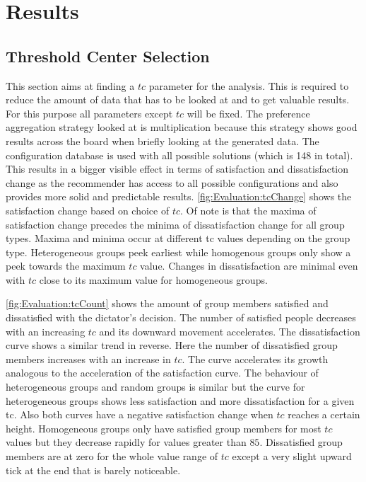 \section{Results}
\label{sec:Evaluation:Findings}

\subsection{Threshold Center Selection}
This section aims at finding a $tc$ parameter for the analysis. This is required to reduce the amount of data that has to be looked at and to get valuable results. For this purpose all parameters except $tc$ will be fixed. The preference aggregation strategy looked at is multiplication because this strategy shows good results across the board when briefly looking at the generated data. The configuration database is used with all possible solutions (which is 148 in total). This results in a bigger visible effect in terms of satisfaction and dissatisfaction change as the recommender has access to all possible configurations and also provides more solid and predictable results. \autoref{fig:Evaluation:tcChange} shows the satisfaction change based on choice of $tc$. Of note is that the maxima of satisfaction change precedes the minima of dissatisfaction change for all group types. Maxima and minima occur at different tc values depending on the group type. Heterogeneous groups peek earliest while homogenous groups only show a peek towards the maximum $tc$ value. Changes in dissatisfaction are minimal even with $tc$ close to its maximum value for homogeneous groups. 

\autoref{fig:Evaluation:tcCount} shows the amount of group members satisfied and dissatisfied with the dictator's decision. The number of satisfied people decreases with an increasing $tc$ and its downward movement accelerates. The dissatisfaction curve shows a similar trend in reverse. Here the number of dissatisfied group members increases with an increase in $tc$. The curve accelerates its growth analogous to the acceleration of the satisfaction curve. The behaviour of heterogeneous groups and random groups is similar but the curve for heterogeneous groups shows less satisfaction and more dissatisfaction for a given tc. Also both curves have a negative satisfaction change when $tc$ reaches a certain height. Homogeneous groups only have satisfied group members for most $tc$ values but they decrease rapidly for values greater than $85$. Dissatisfied group members are at zero for the whole value range of $tc$ except a very slight upward tick at the end that is barely noticeable.

